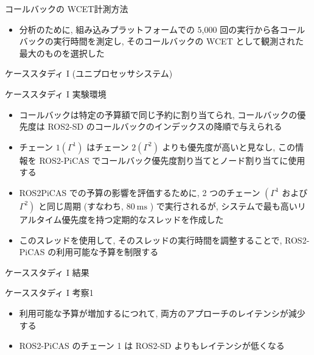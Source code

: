 \begin{frame}{コールバックの WCET計測方法}
    \begin{itemize}
        \item 分析のために, 組み込みプラットフォームでの 5,000 回の実行から各コールバックの実行時間を測定し, そのコールバックの WCET として観測された最大のものを選択した
    \end{itemize}
\end{frame}

\begin{frame}{ケーススタディ I (ユニプロセッサシステム)}
\end{frame}

\begin{frame}{ケーススタディ I 実験環境}
    \begin{itemize}
        \item コールバックは特定の予算額で同じ予約に割り当てられ, コールバックの優先度は ROS2-SD のコールバックのインデックスの降順で与えられる
        \item チェーン $1\left(\Gamma^{1}\right)$ はチェーン $2\left(\Gamma^{2}\right)$ よりも優先度が高いと見なし, この情報を ROS2-PiCAS でコールバック優先度割り当てとノード割り当てに使用する
        \item ROS2PiCAS での予算の影響を評価するために, 2 つのチェーン $\left(\Gamma^{1}\right.$ および $\left.\Gamma^{2}\right)$ と同じ周期 (すなわち,  $80 \mathrm{~ms}$ ) で実行されるが, システムで最も高いリアルタイム優先度を持つ定期的なスレッドを作成した
        \item このスレッドを使用して, そのスレッドの実行時間を調整することで, ROS2-PiCAS の利用可能な予算を制限する
    \end{itemize}
\end{frame}

\begin{frame}{ケーススタディ I 結果}
\end{frame}

\begin{frame}{ケーススタディ I 考察1}
    \begin{itemize}
        \item 利用可能な予算が増加するにつれて, 両方のアプローチのレイテンシが減少する
        \item ROS2-PiCAS のチェーン 1 は ROS2-SD よりもレイテンシが低くなる
    \end{itemize}
\end{frame}

